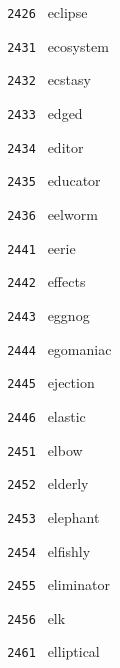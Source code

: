 \documentclass[11pt]{article}
\begin{document}
\begin{multicols}{6}
\noindent \texttt{ 2426 } \hspace{1mm} eclipse  \par
\noindent \texttt{ 2431 } \hspace{1mm} ecosystem  \par
\noindent \texttt{ 2432 } \hspace{1mm} ecstasy  \par
\noindent \texttt{ 2433 } \hspace{1mm} edged  \par
\noindent \texttt{ 2434 } \hspace{1mm} editor  \par
\noindent \texttt{ 2435 } \hspace{1mm} educator  \par
\noindent \texttt{ 2436 } \hspace{1mm} eelworm  \par
\noindent \texttt{ 2441 } \hspace{1mm} eerie  \par
\noindent \texttt{ 2442 } \hspace{1mm} effects  \par
\noindent \texttt{ 2443 } \hspace{1mm} eggnog  \par
\noindent \texttt{ 2444 } \hspace{1mm} egomaniac  \par
\noindent \texttt{ 2445 } \hspace{1mm} ejection  \par
\noindent \texttt{ 2446 } \hspace{1mm} elastic  \par
\noindent \texttt{ 2451 } \hspace{1mm} elbow  \par
\noindent \texttt{ 2452 } \hspace{1mm} elderly  \par
\noindent \texttt{ 2453 } \hspace{1mm} elephant  \par
\noindent \texttt{ 2454 } \hspace{1mm} elfishly  \par
\noindent \texttt{ 2455 } \hspace{1mm} eliminator  \par
\noindent \texttt{ 2456 } \hspace{1mm} elk  \par
\noindent \texttt{ 2461 } \hspace{1mm} elliptical  \par

\end{multicols}
\end{document}
